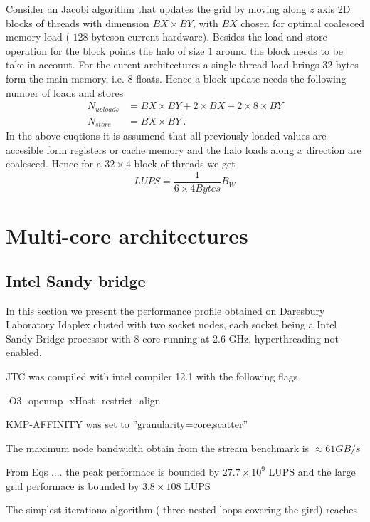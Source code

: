\documentclass[a4paper,12pt]{article}
\begin{document}
Consider an Jacobi algorithm that updates the grid by moving along $z$ axis
2D blocks of threads with dimension $BX\times
BY$, with $BX$ chosen for optimal coalesced memory load ( $128$
byteson current hardware). Besides the
load and store operation for the block points the
halo of size $1$ around the block needs to be take in account. For the curent
architectures a single thread load brings $32$ bytes form the main
memory, i.e. $8$ floats. Hence a block update needs the following
number of loads and stores 
\begin{align}
N_{uploads} & = BX\times BY + 2\times BX + 2\times 8 \times BY \\
N_{store} &=  BX\times BY \ .
\end{align} 
In the above euqtions it is assumend that all previously loaded values are accesible form
registers or cache memory and the halo loads along $x$ direction are coalesced.  
Hence for a $32 \times 4$ block of threads we get
\begin{equation}
LUPS = \frac{1}{6\times 4 Bytes}  B_W 
\end{equation}


\section{Multi-core architectures}

\subsection{Intel Sandy bridge}

In this section we present the performance profile obtained on
Daresbury Laboratory Idaplex clusted with two socket nodes, each
socket being a Intel Sandy Bridge processor with 8 core running at 2.6
GHz, hyperthreading not enabled.

JTC was compiled with intel compiler 12.1 with the following flags 

-O3 -openmp -xHost -restrict -align

KMP-AFFINITY was set to ''granularity=core,scatter''

The maximum node bandwidth obtain from the stream benchmark is
$\approx 61 GB/s$ 

From Eqs .... the peak performace is bounded by $27.7\times 10^9$ LUPS
and the large grid performace is bounded by $3.8\times 108$ LUPS

The simplest iterationa algorithm ( three nested loops covering the
gird) reaches 
\end{document}
